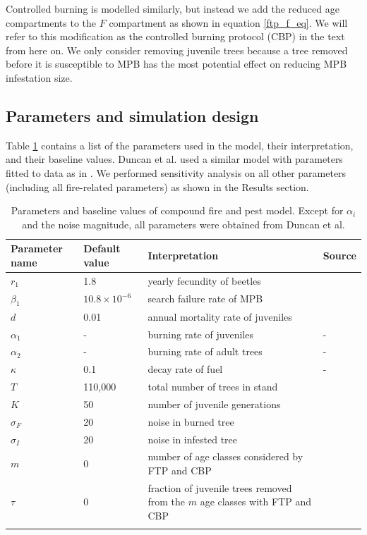 Controlled burning is modelled similarly, but instead we add the reduced age compartments to the $F$ compartment as shown in equation \ref{ftp_f_eq}. We will refer to this modification as the controlled burning protocol (CBP) in the text from here on. We only consider removing juvenile trees because a tree removed before it is susceptible to MPB has the most potential effect on reducing MPB infestation size.

\subsection{Parameters and simulation design}

Table \ref{params} contains a list of the parameters used in the model, their interpretation, and their baseline values. Duncan et al. used a similar model with parameters fitted to data as in \cite{agne2016fire}. We performed sensitivity analysis on all other parameters (including all fire-related parameters) as shown in the Results section.

\begin{table}
\caption{Parameters and baseline values of compound fire and pest model. Except for $\alpha_i$ and the noise magnitude, all parameters were obtained from Duncan et al. \cite{duncan2015model}}
\begin{tabular}{llll}
\hline\noalign{\smallskip}
  Parameter name & Default value & Interpretation & Source \\
\hline\noalign{\smallskip}
  $r_1$ & 1.8  & yearly fecundity of beetles & \cite{powell2009connecting}  \\
  $\beta_1$ & $10.8 \times 10^{-6}$  & search failure rate of MPB & \cite{powell2009connecting}   \\
  $d$ & 0.01  & annual mortality rate of juveniles & \cite{duncan2015model}  \\
  $\alpha_1$& - & burning rate of juveniles & - \\
  $\alpha_2$& - & burning rate of adult trees & - \\
  $\kappa$& 0.1 & decay rate of fuel & - \\
  $T$ & 110,000 & total number of trees in stand & \cite{powell2009connecting} \\
  $K$ & 50 & number of juvenile generations & \cite{duncan2015model} \\
  $\sigma_F$ & 20 & noise in burned tree\\
  $\sigma_I$ & 20 & noise in infested tree\\
  $m$ & 0 & number of age classes considered by FTP and CBP\\
  $\tau$ & 0 & fraction of juvenile trees removed from the $m$  age classes with FTP and CBP\\

\hline\noalign{\smallskip}
\end{tabular}
 \protect \label{params}
\end{table}
\normalsize

